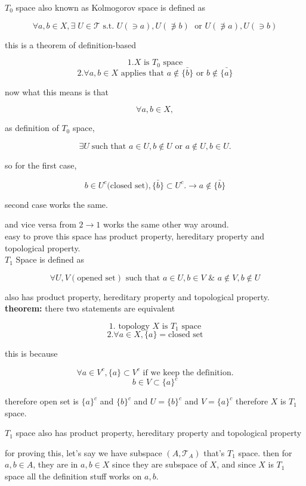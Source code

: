 \documentclass{article}
\begin{document}
$T_0$ space also known as Kolmogorov space is defined as 

\[
\forall a,b\in X, \exists \; U\in \mathcal{T} \text{ s.t. } U(\ni a), U(\not\ni b) \; \text{ or } U(\not\ni a) , U(\ni b)
\]

this is a theorem of definition-based

\[
1. X \text{ is } T_0 \text{ space}
\]
\[
2. \forall a,b\in X \text{ applies that } a \notin \bar{\{b\}} \text{ or } b \notin \bar{\{a\}}
\]

now what this means is that 

\[
\forall a,b\in X, 
\]

as definition of $T_0$ space, 

\[
\exists U \; \text{such that } a\in U, b\notin U \text{ or } a\notin U, b\in U. 
\]

so for the first case,

\[
b\in U^c(\text{closed set)}, \bar{\{b\}}\subset U^c. \rightarrow a\notin \bar{\{b\}}
\]

second case works the same.

and vice versa from $2\rightarrow 1$ works the same other way around.\\

easy to prove this space has product property, hereditary property and topological property.\\

$T_1 $ Space is defined as 

\[
\forall U,V(\text{opened set}) \text{ such that } a\in U, b\in V \text{ & } a\notin V, b\notin U
\]

also has product property, hereditary property and topological property.\\

\textbf{theorem:} there two statements are equivalent

\[
1. \text{ topology } X \text{ is } T_1 \text{ space}
\]
\[
2. \forall a\in X, \{a\}= \text{closed set}
\]

this is because 

\[
\forall a\in V^c, \{a\}\subset V^c \text{ if we keep the definition.} 
\]
\[
b\in V\subset \{a\}^c
\]

therefore open set is $\{a\}^c$ and $\{b\}^c$ and $U=\{b\}^c$ and $V=\{a\}^c$ therefore $X $ is $T_1$ space.

$T_1$ space also has product property, hereditary property and topological property

for proving this, let's say we have subspace $(A,\mathcal{T}_A)$ that's $T_1$ space. then for $a,b\in A$, they are in $a,b \in X$ since they are subspace of $X$, and since $X$ is $T_1$ space all the definition stuff works on $a,b$. 
\end{document}
